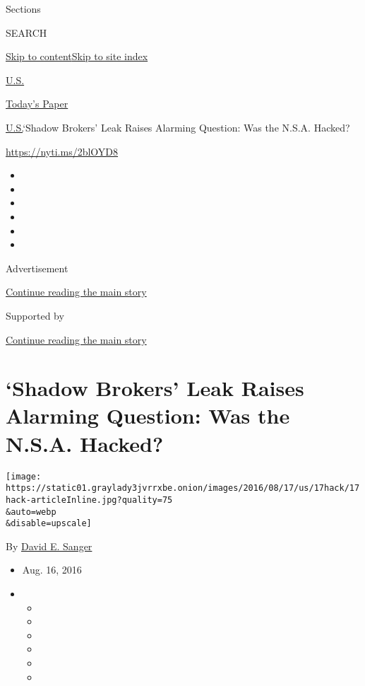 Sections

SEARCH

\protect\hyperlink{site-content}{Skip to
content}\protect\hyperlink{site-index}{Skip to site index}

\href{https://www.nytimes3xbfgragh.onion/section/us}{U.S.}

\href{https://myaccount.nytimes3xbfgragh.onion/auth/login?response_type=cookie\&client_id=vi}{}

\href{https://www.nytimes3xbfgragh.onion/section/todayspaper}{Today's
Paper}

\href{/section/us}{U.S.}\textbar{}`Shadow Brokers' Leak Raises Alarming
Question: Was the N.S.A. Hacked?

\url{https://nyti.ms/2blOYD8}

\begin{itemize}
\item
\item
\item
\item
\item
\item
\end{itemize}

Advertisement

\protect\hyperlink{after-top}{Continue reading the main story}

Supported by

\protect\hyperlink{after-sponsor}{Continue reading the main story}

\hypertarget{shadow-brokers-leak-raises-alarming-question-was-the-nsa-hacked}{%
\section{`Shadow Brokers' Leak Raises Alarming Question: Was the N.S.A.
Hacked?}\label{shadow-brokers-leak-raises-alarming-question-was-the-nsa-hacked}}

\texttt{[image: https://static01.graylady3jvrrxbe.onion/images/2016/08/17/us/17hack/17hack-articleInline.jpg?quality=75\\\&auto=webp\\\&disable=upscale]}

By \href{http://www.nytimes3xbfgragh.onion/by/david-e-sanger}{David E.
Sanger}

\begin{itemize}
\item
  Aug. 16, 2016
\item
  \begin{itemize}
  \item
  \item
  \item
  \item
  \item
  \item
  \end{itemize}
\end{itemize}

